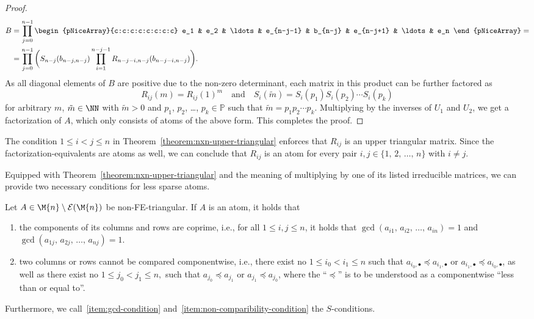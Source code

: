 \begin{proof}
\begin{align*}
B &= \prod_{j=0}^{n-1} \begin{pNiceArray}{c:c:c:c:c:c:c:c} e_1 & e_2 & \ldots & e_{n-j-1} & b_{n-j} & e_{n-j+1} & \ldots & e_n \end{pNiceArray} = \\
&= \prod_{j=0}^{n-1} \bigg( S_{n-j}(b_{n-j,n-j}) \prod_{i=1}^{n-j-1} R_{n-j-i,n-j}(b_{n-j-i,n-j}) \biggr). 
\end{align*}
As all diagonal elements of $B$ are positive due to the non-zero determinant, each matrix in this product can be further factored as 
\[ R_{ij}(m) = R_{ij}(1)^m \quad \text{and} \quad S_i(\tilde{m}) = S_i(p_1)S_i(p_2)\cdots S_i(p_k) \]
for arbitrary $m$, $\tilde{m} \in \NN$ with $\tilde{m} > 0 $ and $p_1$, $p_2$, \dots, $p_k \in \mathbb{P}$ such that $\tilde{m} = p_1p_2\cdots p_k$. Multiplying by the inverses of $U_1$ and $U_2$, we get a factorization of $A$, which only consists of atoms of the above form. This completes the proof.
\end{proof}

\begin{remark*}
The condition $1\leq i < j\leq n$ in Theorem~\ref{theorem:nxn-upper-triangular} enforces that $R_{ij}$ is an upper triangular matrix. Since the factorization-equivalents are atoms as well, we can conclude that $R_{ij}$ is an atom for every pair $i,j \in \{ 1, \, 2, \, \dots, \, n\}$ with $i \neq j$.
\end{remark*}

Equipped with Theorem~\ref{theorem:nxn-upper-triangular} and the meaning of multiplying by one of its listed irreducible matrices, we can provide two necessary conditions for less sparse atoms.

\begin{theorem}[$S$-conditions]\label{theorem:s-conditions}
Let $A \in \M{n}\setminus \mathcal{E}(\M{n})$ be non-FE-triangular. If $A$ is an atom, it holds that
\begin{enumerate}[label=(S\arabic*)]
\item\label{item:gcd-condition} the components of its columns and rows are coprime, i.e., for all $1\leq i,j \leq n$, it holds that $\gcd{(a_{i1}, \, a_{i2}, \, \dots, \, a_{in})}=1$ and $\gcd{(a_{1j},\,a_{2j},\, \dots,\,a_{nj})}=1$.
\item\label{item:non-comparibility-condition} two columns or rows cannot be compared componentwise, i.e., there exist no $1 \leq i_0 < i_1 \leq n$ such that $a_{i_0,\bullet} \preceq a_{i_1,\bullet}$ or $a_{i_1,\bullet} \preceq a_{i_0,\bullet}$, as well as there exist no $1 \leq j_0 <j_1 \leq n,$ such that $a_{j_0} \preceq a_{j_1}$ or $a_{j_1} \preceq a_{j_0}$, where the ``$\preceq$'' is to be understood as a componentwise ``less than or equal to''.
\end{enumerate}
Furthermore, we call~\ref{item:gcd-condition} and~\ref{item:non-comparibility-condition} the $S$-conditions.
\end{theorem}

